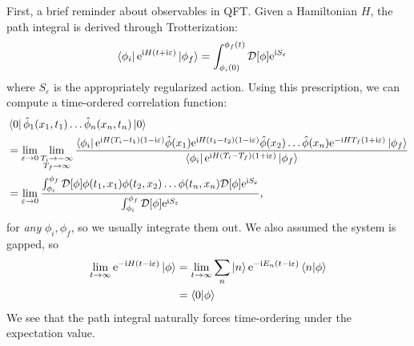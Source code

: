 \documentclass[11pt]{article}
\newcommand{\e}{\mathrm{e}}
\newcommand{\ii}{\mathrm{i}}
\renewcommand{\epsilon}{\varepsilon}
\begin{document}
First, a brief reminder about observables in QFT. Given a Hamiltonian $H$, the
path integral is derived through Trotterization:
\begin{align}
  \bra{\phi_i}\e^{\ii H(t+ \ii \epsilon)}\ket{\phi_f} &= \int_{\phi_i(0)}^{\phi_f(t)}\mathcal D[\phi]\e^{\ii S_\epsilon}
\end{align}
where $S_\epsilon$ is the appropriately regularized action. Using this prescription, we can compute a time-ordered
correlation function:
\begin{align}
  &\bra{0}\hat\phi_1(x_1, t_1) \ldots \hat \phi_n(x_n, t_n) \ket{0} \notag \\
  &= \lim_{\epsilon \to 0}\lim_{\substack{T_i \to -\infty\\ T_f \to \infty}}\frac{\bra{\phi_i}\e^{\ii H (T_i - t_1)(1- \ii \epsilon)}\hat \phi(x_1) \e^{\ii H(t_1 - t_2)(1 - \ii \epsilon)} \hat \phi(x_2) \ldots \hat \phi(x_n) \e^{-\ii HT_f(1+\ii \epsilon)}\ket{\phi_f}}{\bra{\phi_i}\e^{\ii H(T_i - T_f)(1+ \ii \epsilon)}\ket{\phi_f}} \\
  &= \lim_{\epsilon \to 0}\frac{\int_{\phi_i}^{\phi_f}\mathcal D[\phi]\phi(t_1, x_1)\phi(t_2, x_2)\ldots \phi(t_n, x_n)\mathcal D[\phi]\e^{\ii S_\epsilon}}{\int_{\phi_i}^{\phi_f}\mathcal D[\phi]\e^{\ii S_\epsilon}},
\end{align}
for \emph{any} $\phi_i, \phi_f$, so we usually integrate them out.
We also assumed the system is gapped, so
\begin{align}
  \lim_{t \to \infty}\e^{-\ii H (t-\ii \epsilon)}\ket{\phi} &= \lim_{t \to \infty}\sum_{n} \ket{n} \e^{-\ii E_n (t - \ii \epsilon)}\braket{n}{\phi} \notag\\
  &= \braket{0}{\phi}
\end{align}
We see that the path integral naturally forces time-ordering under the
expectation value. 
\end{document}
